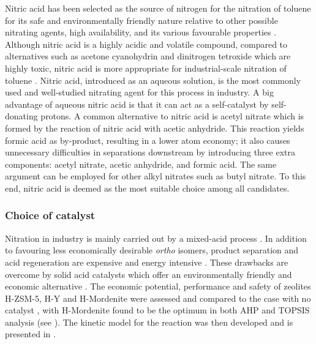 Nitric acid has been selected as the source of nitrogen for the nitration of toluene for its safe and environmentally friendly nature relative to other possible nitrating agents, high availability, and its various favourable properties \cite{miller_kinetics_1964, sreedhar_scientific_2013}. Although nitric acid is a highly acidic and volatile compound, compared to alternatives such as acetone cyanohydrin and dinitrogen tetroxide which are highly toxic, nitric acid is more appropriate for industrial-scale nitration of toluene \cite{dagade_nitration_2002, sreedhar_scientific_2013}. Nitric acid, introduced as an aqueous solution, is the most commonly used and well-studied nitrating agent for this process in industry. \cite{bowers_toluidines_2000} A big advantage of aqueous nitric acid is that it can act as a self-catalyst by self-donating protons. \cite{miller_kinetics_1964} A common alternative to nitric acid is acetyl nitrate which is formed by the reaction of nitric acid with acetic anhydride. \cite{vassena_selective_1999} This reaction yields formic acid as by-product, resulting in a lower atom economy; it also causes unnecessary difficulties in separations downstream by introducing three extra components: acetyl nitrate, acetic anhydride, and formic acid. The same argument can be employed for other alkyl nitrates such as butyl nitrate. To this end, nitric acid is deemed as the most suitable choice among all candidates.


\subsubsection{Choice of catalyst}
Nitration in industry is mainly carried out by a mixed-acid process \cite{halder_nitration_2007}.
In addition to favouring less economically desirable \textit{ortho} isomers, product separation and acid regeneration are expensive and energy intensive \cite{sreedhar_scientific_2013}.
These drawbacks are overcome by solid acid catalysts which offer an environmentally friendly and economic alternative \cite{vassena_selective_1999}.
The economic potential, performance and safety of zeolites H-ZSM-5, H-Y and H-Mordenite were assessed and compared to the case with no catalyst \cite{jeeru_kinetics_2018}, with H-Mordenite found to be the optimum in both AHP and TOPSIS analysis (see ).
The kinetic model for the reaction was then developed and is presented in .

